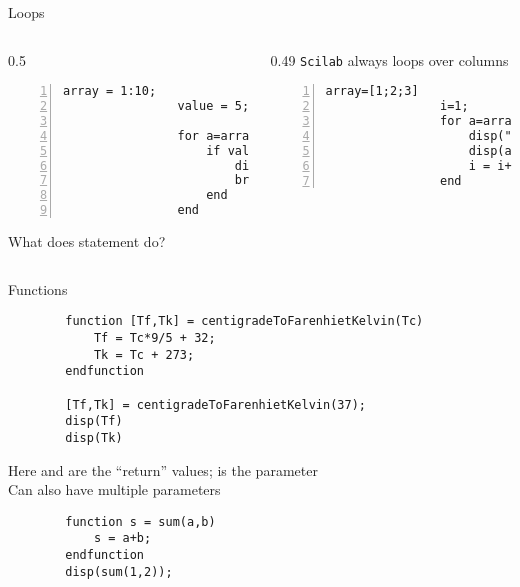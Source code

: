 \documentclass[%
    10pt,
    xcolor={dvipsnames},
    compress, %
]{beamer}
\newcommand{\scilab}{\texttt{Scilab}}
\begin{document}
\begin{frame}[fragile]{Loops}
    \begin{columns}
        \begin{column}{0.5\linewidth}
            \begin{lstlisting}[numbers=left]
                array = 1:10;
                value = 5;
                
                for a=array
                    if value==a then
                        disp("Value exists in array");
                        break;
                    end
                end
            \end{lstlisting}
            What does  statement do?
        \end{column}
        \begin{column}{0.49\linewidth}
            \scilab{} always loops over columns
            \begin{lstlisting}[numbers=left]
                array=[1;2;3]
                i=1;
                for a=array
                    disp("Element " + string(i) + ":")
                    disp(a)
                    i = i+1;
                end
            \end{lstlisting}
        \end{column}
    \end{columns}
\end{frame}

\begin{frame}[fragile]{Functions}
    \begin{lstlisting}
        function [Tf,Tk] = centigradeToFarenhietKelvin(Tc)
            Tf = Tc*9/5 + 32;
            Tk = Tc + 273;
        endfunction
        
        [Tf,Tk] = centigradeToFarenhietKelvin(37);
        disp(Tf)
        disp(Tk)
    \end{lstlisting}
    Here  and  are the ``return'' values;  is the parameter\\[0.5em]
    Can also have multiple parameters
    \begin{lstlisting}
        function s = sum(a,b)
            s = a+b;
        endfunction
        disp(sum(1,2));
    \end{lstlisting}
\end{frame}
\end{document}
